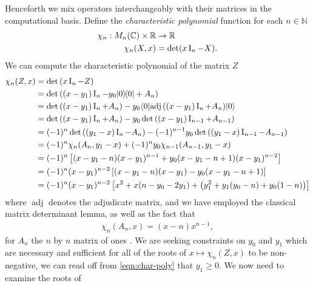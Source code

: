 
Henceforth we mix operators interchangeably with their matrices in the computational basis. Define the \emph{characteristic polynomial} function for each $n\in\mathbb{N}$
\begin{align}
  \chi_n:M_n(\mathbb{C})\times \mathbb{R} &\to \mathbb{R}\\
  \chi_n(X, x) &= \det(x\operatorname{I}_n - X).
\end{align}
We can compute the characteristic polynomial of the matrix $Z$
\begin{align}
  \chi_n(Z,x) &= \det\left(x\operatorname{I}_n -Z\right)\\
              &=\det\left((x-y_1)\operatorname{I}_n - y_0|0\rangle\!\langle0| + A_n\right)\\
              &=\det\left((x-y_1)\operatorname{I}_n + A_n\right) -y_0 \langle 0 |{\operatorname{adj}\left({(x-y_1)\operatorname{I}_n + A_n}\right)} | 0 \rangle\\
              &=\det\left((x-y_1)\operatorname{I}_n + A_n\right) -y_0 \det\left((x-y_1)\operatorname{I}_{n-1} + A_{n-1}\right)\\
              &=(-1)^n \det\left((y_1-x)\operatorname{I}_n - A_n\right) -(-1)^{n-1} y_0 \det\left((y_1-x)\operatorname{I}_{n-1} - A_{n-1}\right)\\
              &=(-1)^n \chi_n(A_n,y_1-x)  + (-1)^{n} y_0 \chi_{n-1}(A_{n-1}, y_1-x)\\
              &= (-1)^n\left[(x-y_1-n)(x-y_1)^{n-1} +y_0(x-y_1-n+1)(x-y_1)^{n-2}\right]\\
              &= (-1)^n(x-y_1)^{n-2}\left[(x-y_1-n)(x-y_1) -y_0(x-y_1-n+1)\right]\\
              &= (-1)^n(x-y_1)^{n-2}\left[x^2 + x(n-y_0 -2y_1) + \left(y_1^2 + y_1(y_0-n) + y_0(1-n)\right)\right]
                \label{eqn:char-poly}
\end{align}
where $\operatorname{adj}$ denotes the adjudicate matrix, and we have employed the classical matrix determinant lemma, as well as the fact that
\begin{align}
  \chi_n(A_n,x) = (x-n)x^{n-1},
\end{align}
for $A_n$ the $n$ by $n$ matrix of ones \cite{matrix-analysis}.
We are seeking constraints on $y_0$ and $y_1$ which are necessary and sufficient for all of the roots of $x\mapsto \chi_n(Z,x)$ to be non-negative, we can read off from \eqref{eqn:char-poly} that $y_1 \geq 0$. We now need to examine the roots of 
